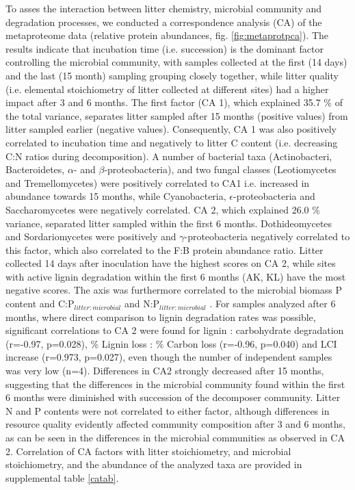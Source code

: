 To asses the interaction between litter chemistry, microbial community and degradation processes, we conducted a correspondence analysis (CA) of the metaproteome data (relative protein abundances, fig. \ref{fig:metaprotpca}). The results indicate that incubation time (i.e. succession) is the dominant factor controlling the microbial community, with samples collected at the first (14 days) and the last (15 month) sampling grouping closely together, while litter quality (i.e. elemental stoichiometry of litter collected at different sites) had a higher impact after 3 and 6 months. The first factor (CA 1), which explained 35.7 \% of the total variance, separates litter sampled after 15 months (positive values) from litter sampled earlier (negative values). Consequently, CA 1 was also positively correlated to incubation time and negatively to litter C content (i.e. decreasing C:N ratios during decomposition). A number of bacterial taxa (Actinobacteri, Bacteroidetes, $\alpha$- and $\beta$-proteobacteria), and two 
fungal classes (Leotiomycetes and Tremellomycetes) were positively correlated to CA1 i.e. increased in abundance towards 15 months, while Cyanobacteria, $\epsilon$-proteobacteria and Saccharomycetes were negatively correlated. CA 2, which explained 26.0 \% variance, separated litter sampled within the first 6 months. Dothideomycetes and Sordariomycetes were positively and $\gamma$-proteobacteria negatively correlated to this factor, which also correlated to the F:B protein abundance ratio. Litter collected 14 days after inoculation have the highest scores on CA 2, while sites with active lignin degradation within the first 6 months (AK, KL) have the most negative scores. The axis was furthermore correlated to the microbial biomass P content and C:P$_{litter:microbial}$ and N:P$_{litter:microbial}$ . For samples analyzed after 6 months, where direct comparison to lignin degradation rates was possible, significant correlations to CA 2 were found for lignin : carbohydrate 
degradation (r=-0.97, p=0.028), \% Lignin loss : \% Carbon loss (r=-0.96, p=0.040) and  LCI increase (r=0.973, p=0.027), even though the number of independent samples was very low (n=4). Differences in CA2 strongly decreased after 15 months, suggesting that the differences in the microbial community found within the first 6 months were diminished with succession of the decomposer community. Litter N and P contents were not correlated to either factor, although differences in resource quality evidently affected community composition after 3 and 6 months, as can be seen in the differences in the microbial communities as observed in CA 2. Correlation of CA factors with litter stoichiometry, and microbial stoichiometry, and the abundance of the analyzed taxa are provided in supplemental table \ref{catab}.